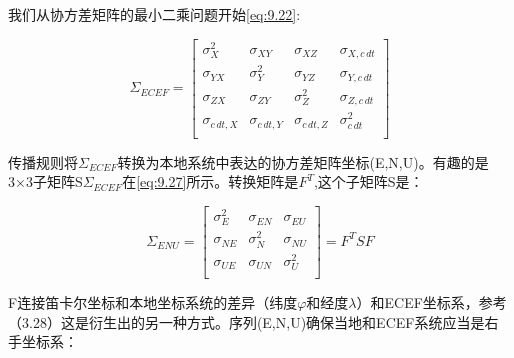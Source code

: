 	我们从协方差矩阵的最小二乘问题开始\ref{eq:9.22}:

		\begin{equation}\label{eq:9.27}

			\Sigma_{ECEF} = 

			\begin{bmatrix}

				\sigma^2_X & \sigma_{XY} & \sigma_{XZ} & \sigma_{X,c\,dt} \\

				\sigma_{YX}& \sigma^2_Y  & \sigma_{YZ} & \sigma_{Y,c\,dt} \\

				\sigma_{ZX}& \sigma_{ZY} & \sigma^2_Z & \sigma_{Z,c\,dt} \\

				\sigma_{c\,dt,X} & \sigma_{c\,dt,Y} & \sigma_{c\,dt,Z} & \sigma^2_{c\,dt} \\

			\end{bmatrix}

		\end{equation}

	传播规则将$\Sigma_{ECEF}$转换为本地系统中表达的协方差矩阵坐标(E,N,U)。有趣的是3×3子矩阵S$\Sigma_{ECEF}$在\ref{eq:9.27}所示。转换矩阵是$F^T$,这个子矩阵S是：

		\begin{equation}\label{eq:9.28}

			\Sigma_{ENU} = 

			\begin{bmatrix}

				\sigma^2_E & \sigma_{EN} & \sigma_{EU} \\

				\sigma_{NE}& \sigma^2_N  & \sigma_{NU} \\

				\sigma_{UE}& \sigma_{UN} & \sigma^2_U \\

			\end{bmatrix}

			=F^TSF

		\end{equation} 

	F连接笛卡尔坐标和本地坐标系统的差异（纬度$\varphi$和经度$\lambda$）和ECEF坐标系，参考（3.28）这是衍生出的另一种方式。序列(E,N,U)确保当地和ECEF系统应当是右手坐标系：

